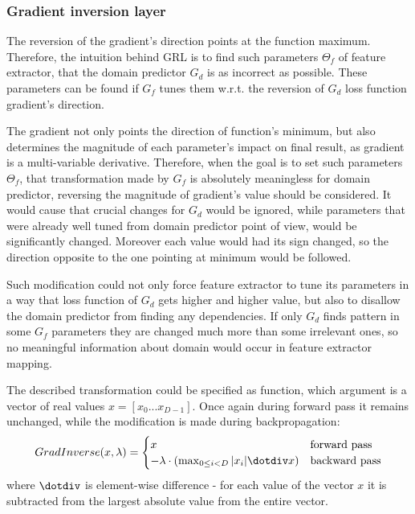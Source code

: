 \documentclass{article}
\begin{document}
\subsubsection{Gradient inversion layer}
The reversion of the gradient's direction points at the function maximum. Therefore, the intuition behind GRL is to find such parameters $\Theta_{f}$ of feature extractor, that the domain predictor $G_{d}$ is as incorrect as possible. These parameters can be found if $G_{f}$ tunes them w.r.t. the reversion of $G_{d}$ loss function gradient's direction.
\par
The gradient not only points the direction of function's minimum, but also determines the magnitude of each parameter's impact on final result, as gradient is a multi-variable derivative. Therefore, when the goal is to set such parameters $\Theta_{f}$, that transformation made by $G_{f}$ is absolutely meaningless for domain predictor, reversing the magnitude of gradient's value should be considered. It would cause that crucial changes for $G_{d}$ would be ignored, while parameters that were already well tuned from domain predictor point of view, would be significantly changed. Moreover each value would had its sign changed, so the direction opposite to the one pointing at minimum would be followed. 
\par
Such modification could not only force feature extractor to tune its parameters in a way that loss function of $G_{d}$ gets higher and higher value, but also to disallow the domain predictor from finding any dependencies. If only $G_{d}$ finds pattern in some $G_{f}$ parameters they are changed much more than some irrelevant ones, so no meaningful information about domain would occur in feature extractor mapping. 
\par
The described transformation could be specified as function, which argument is a vector of real values $x = [x_{0}...x_{D-1}]$. Once again during forward pass it remains unchanged, while the modification is made during backpropagation:
\begin{equation*}
GradInverse(x, \lambda) = \begin{cases}
x &\text{forward pass}\\
-\lambda \cdot (\max_{0 \leq i < D} |x_{i}| \dotdiv x) &\text{backward pass}
\end{cases}
\end{equation*}
where $\dotdiv$ is element-wise difference - for each value of the vector $x$ it is subtracted from the largest absolute value from the entire vector.
\par
\end{document}
